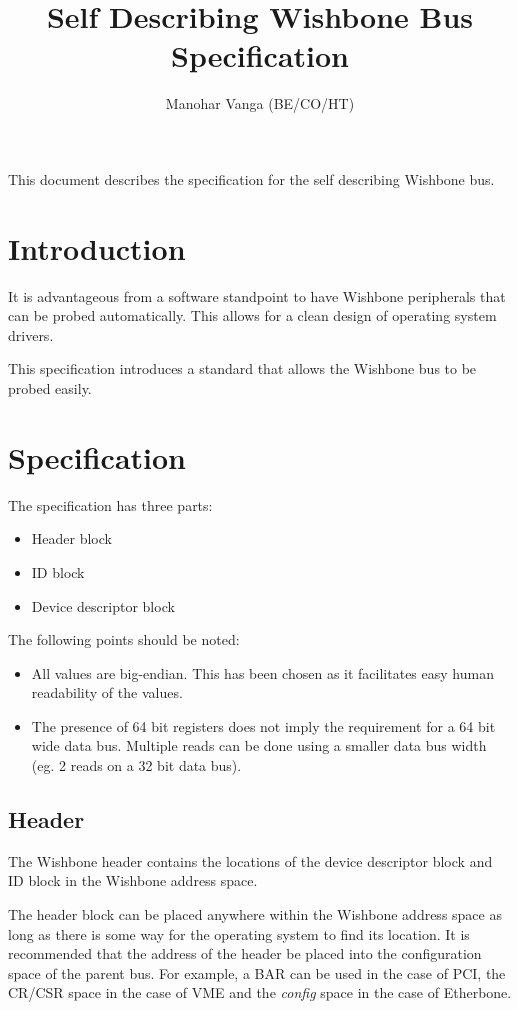 \documentclass{article}
\title{Self Describing Wishbone Bus Specification}
\author{Manohar Vanga (BE/CO/HT)}
\begin{document}
\maketitle

This document describes the specification for the self describing Wishbone
bus.

\section{Introduction}

It is advantageous from a software standpoint to have Wishbone peripherals
that can be probed automatically. This allows for a clean design of operating
system drivers.

This specification introduces a standard that allows the Wishbone bus to be
probed easily.

\section{Specification}

The specification has three parts:

\begin{itemize}
\item Header block
\item ID block
\item Device descriptor block
\end{itemize}

The following points should be noted:

\begin{itemize}
\item All values are big-endian. This has been chosen as it facilitates easy
human readability of the values.
\item The presence of 64 bit registers does not imply the requirement for a
64 bit wide data bus. Multiple reads can be done using a smaller data
bus width (eg. 2 reads on a 32 bit data bus).
\end{itemize}

\subsection{Header}

The Wishbone header contains the locations of the device descriptor block and 
ID block in the Wishbone address space.

The header block can be placed anywhere within the Wishbone address space
as long as there is some way for the operating system to find its location.
It is recommended that the address of the header be placed into the configuration
space of the parent bus. For example, a BAR can be used in the case of PCI,
the CR/CSR space in the case of VME and the \emph{config} space in the case
of Etherbone.
\end{document}
